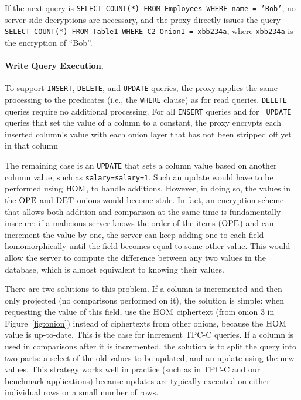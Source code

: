 If the next query is {\tt SELECT COUNT(*) FROM Employees WHERE name =
  'Bob'}, no server-side decryptions are necessary, and the proxy
directly issues the query {\tt SELECT COUNT(*) FROM Table1 WHERE
  C2-Onion1 = xbb234a}, where \texttt{xbb234a} is the encryption of ``Bob''.



\paragraph{Write Query Execution.}

To support {\tt INSERT}, {\tt DELETE}, and {\tt UPDATE} queries, the
\name{} proxy applies the same processing to the predicates (i.e., the
{\tt WHERE} clause) as for read queries.  {\tt DELETE} queries require
no additional processing.  For all {\tt INSERT} queries and for {\tt
  UPDATE} queries that set the value of a column to a constant, the
proxy encrypts each inserted column's value with each onion layer that
has not been stripped off yet in that column

The remaining case is an {\tt UPDATE} that sets a column value based
on another column value, such as {\tt salary=salary+1}.  Such an
update would have to be performed using $\textrm{HOM}$, to handle additions.
However, in doing so, the values in the $\textrm{OPE}$ and $\textrm{DET}$ onions would
become stale.  In fact, an encryption scheme that allows both addition
and comparison at the same time is fundamentally insecure: if a
malicious server knows the order of the items ($\textrm{OPE}$) and can
increment the value by one, the server can keep adding one to each
field homomorphically until the field becomes equal to some other
value.  This would allow the server to compute the difference between
any two values in the database, which is almost equivalent to knowing
their values.

There are two solutions to this problem.  If a column is incremented
and then only projected (no comparisons performed on it), the solution
is simple: when requesting the value of this field, use the $\textrm{HOM}$
ciphertext (from onion 3 in Figure~\ref{fig:onion}) instead of ciphertexts
from other onions, because the $\textrm{HOM}$ value is up-to-date.  This
is the case for increment TPC-C queries.
If a column is used in comparisons after it is
incremented, the solution is to split the query into two parts:
a select of the old values to be updated, and an update using
the new values. 
This strategy works well in practice (such as in TPC-C and our benchmark
applications) because updates are typically executed on either individual
rows or a small number of rows.

